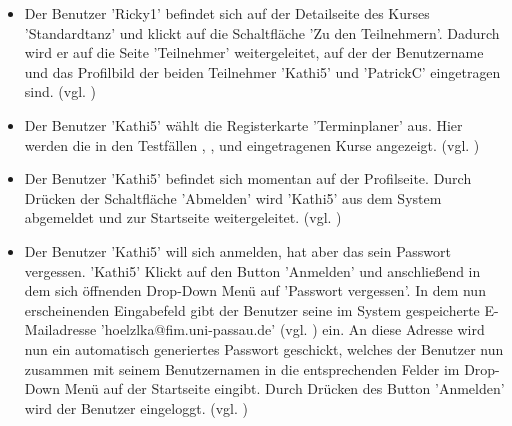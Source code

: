 \documentclass[a4paper]{scrreprt}
\begin{document}
\begin{itemize}
				\item {}
				Der Benutzer 'Ricky1' befindet sich auf der Detailseite des Kurses 'Standardtanz' und klickt auf die Schaltfläche 'Zu den Teilnehmern'. Dadurch wird er auf die Seite 'Teilnehmer' weitergeleitet, auf der der Benutzername und das Profilbild der beiden Teilnehmer 'Kathi5' und 'PatrickC' eingetragen sind. (vgl. )
				
				\item {}
				Der Benutzer 'Kathi5' wählt die Registerkarte 'Terminplaner' aus. Hier werden die in den Testfällen , ,  und  eingetragenen Kurse angezeigt. (vgl. )
				
				\item {}
				Der Benutzer 'Kathi5' befindet sich momentan auf der Profilseite. Durch Drücken der Schaltfläche 'Abmelden' wird 'Kathi5' aus dem System abgemeldet und zur Startseite weitergeleitet. (vgl. )
					
				\item {}
				Der Benutzer 'Kathi5' will sich anmelden, hat aber das sein Passwort vergessen. 'Kathi5' Klickt auf den Button 'Anmelden' und anschließend in dem sich öffnenden Drop-Down Menü auf 'Passwort vergessen'. In dem nun erscheinenden Eingabefeld gibt der Benutzer seine im System gespeicherte E-Mailadresse 'hoelzlka@fim.uni-passau.de' (vgl. ) ein. An diese Adresse wird nun ein automatisch generiertes Passwort geschickt, welches der Benutzer nun zusammen mit seinem Benutzernamen in die entsprechenden Felder im Drop-Down Menü auf der Startseite eingibt. Durch Drücken des Button 'Anmelden' wird der Benutzer eingeloggt. (vgl. )
					
			\end{itemize}
\end{document}
